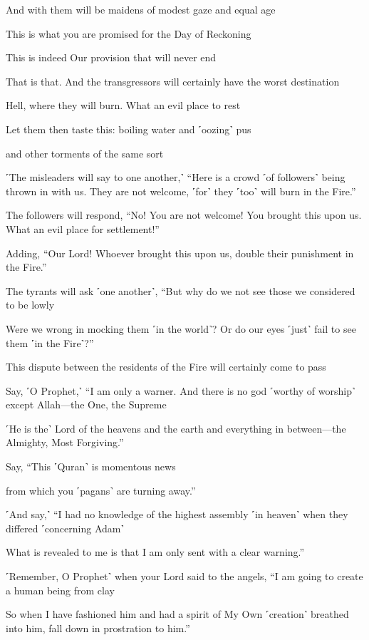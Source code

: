 And with them will be maidens of modest gaze and equal age

This is what you are promised for the Day of Reckoning

This is indeed Our provision that will never end

That is that. And the transgressors will certainly have the worst destination

Hell, where they will burn. What an evil place to rest

Let them then taste this: boiling water and ˹oozing˺ pus

and other torments of the same sort

˹The misleaders will say to one another,˺ “Here is a crowd ˹of followers˺ being thrown in with us. They are not welcome, ˹for˺ they ˹too˺ will burn in the Fire.”

The followers will respond, “No! You are not welcome! You brought this upon us. What an evil place for settlement!”

Adding, “Our Lord! Whoever brought this upon us, double their punishment in the Fire.”

The tyrants will ask ˹one another˺, “But why do we not see those we considered to be lowly

Were we wrong in mocking them ˹in the world˺? Or do our eyes ˹just˺ fail to see them ˹in the Fire˺?”

This dispute between the residents of the Fire will certainly come to pass

Say, ˹O Prophet,˺ “I am only a warner. And there is no god ˹worthy of worship˺ except Allah—the One, the Supreme

˹He is the˺ Lord of the heavens and the earth and everything in between—the Almighty, Most Forgiving.”

Say, “This ˹Quran˺ is momentous news

from which you ˹pagans˺ are turning away.”

˹And say,˺ “I had no knowledge of the highest assembly ˹in heaven˺ when they differed ˹concerning Adam˺

What is revealed to me is that I am only sent with a clear warning.”

˹Remember, O Prophet˺ when your Lord said to the angels, “I am going to create a human being from clay

So when I have fashioned him and had a spirit of My Own ˹creation˺ breathed into him, fall down in prostration to him.”

